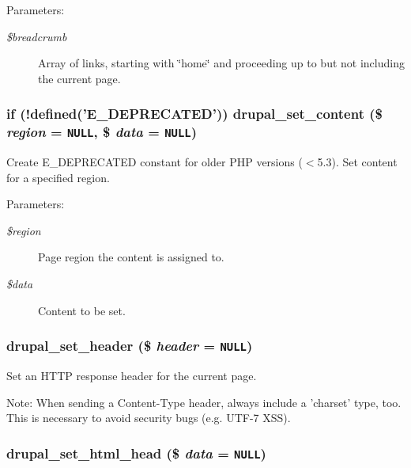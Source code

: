 \begin{Desc}
\item[Parameters:]
\begin{description}
\item[{\em \$breadcrumb}]Array of links, starting with \char`\"{}home\char`\"{} and proceeding up to but not including the current page. \end{description}
\end{Desc}
\hypertarget{common_8inc_5dca93683c64a722bd4f277b8e9f488b}{
\subsubsection[{drupal\_\-set\_\-content}]{\setlength{\rightskip}{0pt plus 5cm}if (!defined('E\_\-DEPRECATED')) drupal\_\-set\_\-content (\$ {\em region} = {\tt NULL}, \/  \$ {\em data} = {\tt NULL})}}
\label{common_8inc_5dca93683c64a722bd4f277b8e9f488b}


Create E\_\-DEPRECATED constant for older PHP versions ($<$5.3). Set content for a specified region.

\begin{Desc}
\item[Parameters:]
\begin{description}
\item[{\em \$region}]Page region the content is assigned to. \item[{\em \$data}]Content to be set. \end{description}
\end{Desc}
\hypertarget{common_8inc_412817c1abb5163a2deb44eb3469b62c}{
\subsubsection[{drupal\_\-set\_\-header}]{\setlength{\rightskip}{0pt plus 5cm}drupal\_\-set\_\-header (\$ {\em header} = {\tt NULL})}}
\label{common_8inc_412817c1abb5163a2deb44eb3469b62c}


Set an HTTP response header for the current page.

Note: When sending a Content-Type header, always include a 'charset' type, too. This is necessary to avoid security bugs (e.g. UTF-7 XSS). \hypertarget{common_8inc_6646f70c300f3a24a25350a47e90d3d1}{
\subsubsection[{drupal\_\-set\_\-html\_\-head}]{\setlength{\rightskip}{0pt plus 5cm}drupal\_\-set\_\-html\_\-head (\$ {\em data} = {\tt NULL})}}
\label{common_8inc_6646f70c300f3a24a25350a47e90d3d1}



